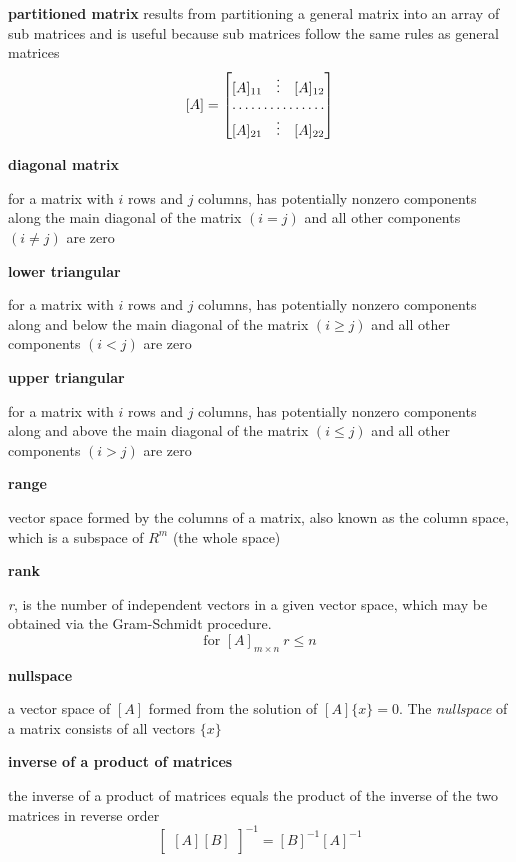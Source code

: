 \documentclass[letterpaper, 10pt, oneside]{article}
\newenvironment{dd}[1]{
	\noindent
	\textbf{\normalsize{#1}}
	\hspace{0.1in}
	\small
	\rmfamily
	}
	{\medskip}
\begin{document}
\begin{dd}{partitioned matrix} results from partitioning a general matrix into an array of sub matrices and is useful because sub matrices follow the same rules as general matrices
\[ [A] =
	\begin{bmatrix}
	[A]_{11} & \vdots & [A]_{12} \\
	\hdotsfor{3} \\
	[A]_{21} & \vdots &[A]_{22}\\
	\end{bmatrix}
	\]
\end{dd}

\begin{dd}{diagonal matrix}
for a matrix with $i$ rows and $j$ columns, has potentially nonzero components along the main diagonal of the matrix $(i=j)$ and all other components $(i \ne j)$ are zero
\end{dd}

\begin{dd}{lower triangular}
for a matrix with $i$ rows and $j$ columns, has potentially nonzero components along and below the main diagonal of the matrix $(i\ge j)$ and all other components $(i < j)$ are zero
\end{dd}

\begin{dd}{upper triangular}
for a matrix with $i$ rows and $j$ columns, has potentially nonzero components along and above the main diagonal of the matrix $(i\le j)$ and all other components $(i > j)$ are zero
\end{dd}

\begin{dd}{range}
vector space formed by the columns of a matrix, also known as the column space, which is a subspace of $R^m$ (the whole space)
\end{dd}

\begin{dd}{rank}
\emph{r}, is the number of independent vectors in a given vector space, which may be obtained via the Gram-Schmidt procedure. $$\text{for } [A]_{m \times n} \ r \le n$$
\end{dd}

\begin{dd}{nullspace}
a vector space of $[A]$ formed from the solution of $[A]\{x\} = 0$. The \emph{nullspace} of a matrix consists of all vectors $\{x\}$ 
\end{dd}

\begin{dd}{inverse of a product of matrices}
the inverse of a product of matrices equals the product of the inverse of the two matrices in reverse order
\[
\begin{bmatrix}
[A][B]
\end{bmatrix}^{-1}
 = [B]^{-1}[A]^{-1} \]
\end{dd}
\end{document}
